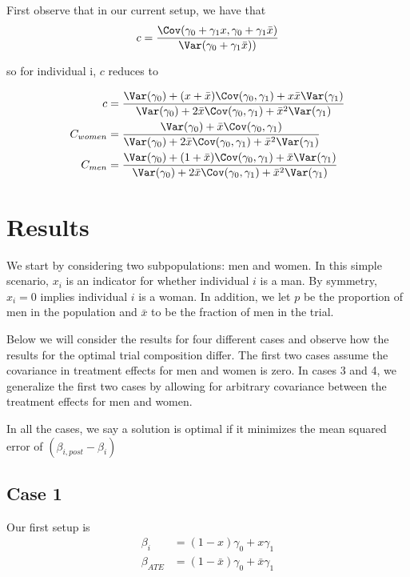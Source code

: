 First observe that in our current setup, we have that
\begin{align*}
	c = \frac{\Cov ( \gamma_0 + \gamma_1 x , \gamma_0  + \gamma_1 \bar{x} )}{ \Var( \gamma_0  + \gamma_1 \bar{x} ))}
\end{align*} 


so for individual i, $c$ reduces to

\begin{align*}
		c &= \frac{\Var(\gamma_0) + (x + \bar{x}) \Cov(\gamma_0, \gamma_1) + x \bar{x} \Var(\gamma_1)}{\Var(\gamma_0) + 2 \bar{x} \Cov(\gamma_0, \gamma_1) + \bar{x}^2\Var(\gamma_1)} \\
		C_{women} &= \frac{\Var(\gamma_0) + \bar{x} \Cov(\gamma_0, \gamma_1)}{\Var(\gamma_0) + 2 \bar{x} \Cov(\gamma_0, \gamma_1) + \bar{x}^2\Var(\gamma_1)} \\
	C_{men} &= \frac{\Var(\gamma_0) + (1 + \bar{x}) \Cov(\gamma_0, \gamma_1) + \bar{x} \Var(\gamma_1)}{\Var(\gamma_0) + 2 \bar{x} \Cov(\gamma_0, \gamma_1) + \bar{x}^2\Var(\gamma_1)} \\
\end{align*} 


\section{Results}


We start by considering two subpopulations: men and women. In this simple scenario, $x_i$ is an indicator for whether individual $i$ is a man.  
By symmetry, $x_i=0$ implies individual $i$ is a woman.
In addition, we let $p$ be the proportion of men in the population and $\bar{x}$ to be the fraction of men in the trial. 

Below we will consider the results for four different cases and observe how the results for the optimal trial composition differ. The first two cases assume the covariance in treatment effects for men and women is zero.
In cases 3 and 4, we generalize the first two cases by allowing for arbitrary covariance between the treatment effects for men and women.


In all the cases, we say a solution is optimal if it minimizes the mean squared error of 
$(\beta_{i,post} - \beta_{i})$

\subsection*{Case 1}
Our first setup is
\begin{align*}
	\beta_i &= (1 - x) \gamma_0 + x \gamma_1 \\
	\beta_{ATE} &= (1 - \bar{x}) \gamma_0 + \bar{x} \gamma_1 \\
\end{align*}

